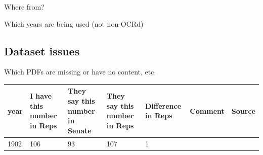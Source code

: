 \documentclass[12pt,]{article}
\theoremstyle{definition}
\theoremstyle{definition}
\theoremstyle{definition}
\theoremstyle{remark}
\begin{document}
Where from?

Which years are being used (not non-OCRd)

\subsection{Dataset issues}\label{dataset-issues}

Which PDFs are missing or have no content, etc.

\begin{longtable}[]{@{}lllllll@{}}
\toprule
\begin{minipage}[b]{0.02\columnwidth}\raggedright\strut
year\strut
\end{minipage} & \begin{minipage}[b]{0.09\columnwidth}\raggedright\strut
I have this number in Reps\strut
\end{minipage} & \begin{minipage}[b]{0.10\columnwidth}\raggedright\strut
They say this number in Senate\strut
\end{minipage} & \begin{minipage}[b]{0.10\columnwidth}\raggedright\strut
They say this number in Reps\strut
\end{minipage} & \begin{minipage}[b]{0.07\columnwidth}\raggedright\strut
Difference in Reps\strut
\end{minipage} & \begin{minipage}[b]{0.11\columnwidth}\raggedright\strut
Comment\strut
\end{minipage} & \begin{minipage}[b]{0.31\columnwidth}\raggedright\strut
Source\strut
\end{minipage}\tabularnewline
\midrule
\endhead
\begin{minipage}[t]{0.02\columnwidth}\raggedright\strut
1902\strut
\end{minipage} & \begin{minipage}[t]{0.09\columnwidth}\raggedright\strut
106\strut
\end{minipage} & \begin{minipage}[t]{0.10\columnwidth}\raggedright\strut
93\strut
\end{minipage} & \begin{minipage}[t]{0.10\columnwidth}\raggedright\strut
107\strut
\end{minipage} & \begin{minipage}[t]{0.07\columnwidth}\raggedright\strut
1\strut
\end{minipage} & \begin{minipage}[t]{0.11\columnwidth}\raggedright\strut

\end{minipage}
\end{longtable}
\end{document}
